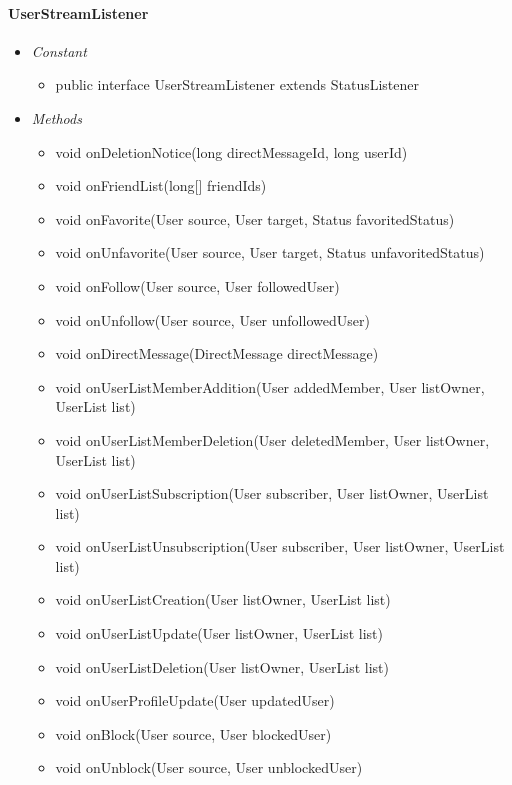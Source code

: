 	\paragraph{UserStreamListener}
	
	\begin{itemize}
		\item \textit{Constant}
		
		\begin{itemize}
			\item public interface UserStreamListener
			extends StatusListener
		\end{itemize}
		\item \textit{Methods}
		
		\begin{itemize}
			\item void onDeletionNotice(long directMessageId, long userId)
			\item void onFriendList(long[] friendIds)
			\item void onFavorite(User source, User target, Status favoritedStatus)
			\item void onUnfavorite(User source, User target, Status unfavoritedStatus)
			\item void onFollow(User source, User followedUser)
			\item void onUnfollow(User source, User unfollowedUser)
			\item void onDirectMessage(DirectMessage directMessage)
			\item void onUserListMemberAddition(User addedMember, User listOwner, UserList list)
			\item void onUserListMemberDeletion(User deletedMember, User listOwner, UserList list)
			\item void onUserListSubscription(User subscriber, User listOwner, UserList list)
			\item void onUserListUnsubscription(User subscriber, User listOwner, UserList list)
			\item void onUserListCreation(User listOwner, UserList list)
			\item void onUserListUpdate(User listOwner, UserList list)
			\item void onUserListDeletion(User listOwner, UserList list)
			\item void onUserProfileUpdate(User updatedUser)
			\item void onBlock(User source, User blockedUser)
			\item void onUnblock(User source, User unblockedUser)
		\end{itemize}
	\end{itemize}
